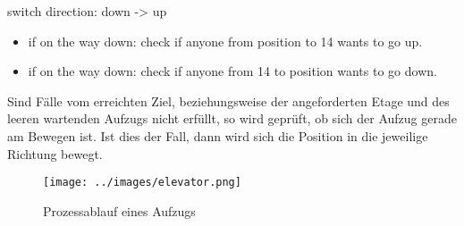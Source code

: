 \documentclass[envcountsame, envcountchap, deutsch]{i-studis}
\providecommand{\tightlist}{%
  \setlength{\itemsep}{0pt}\setlength{\parskip}{0pt}}
\begin{document}
switch direction: down -\textgreater{} up

\begin{itemize}
\tightlist
\item
  if on the way down: check if anyone from position to 14 wants to go
  up.
\item
  if on the way down: check if anyone from 14 to position wants to go
  down.
\end{itemize}

Sind Fälle vom erreichten Ziel, beziehungsweise der angeforderten Etage
und des leeren wartenden Aufzugs nicht erfüllt, so wird geprüft, ob sich
der Aufzug gerade am Bewegen ist. Ist dies der Fall, dann wird sich die
Position in die jeweilige Richtung bewegt.

\begin{figure}
\centering
\texttt{[image: ../images/elevator.png]}
\caption{Prozessablauf eines Aufzugs}
\end{figure}




\end{document}
